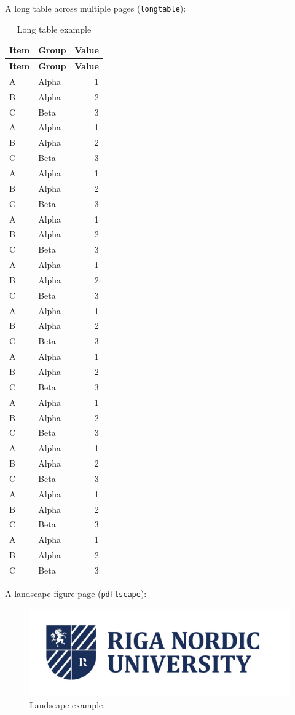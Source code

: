 A long table across multiple pages (\texttt{longtable}):
\begin{longtable}{llr}
\caption{Long table example}\label{tab:long}\\
\toprule
\textbf{Item} & \textbf{Group} & \textbf{Value}\\
\midrule
\endfirsthead
\toprule
\textbf{Item} & \textbf{Group} & \textbf{Value}\\
\midrule
\endhead
\bottomrule
\endfoot
A & Alpha & 1\\
B & Alpha & 2\\
C & Beta  & 3\\
A & Alpha & 1\\
B & Alpha & 2\\
C & Beta  & 3\\
A & Alpha & 1\\
B & Alpha & 2\\
C & Beta  & 3\\
A & Alpha & 1\\
B & Alpha & 2\\
C & Beta  & 3\\
A & Alpha & 1\\
B & Alpha & 2\\
C & Beta  & 3\\
A & Alpha & 1\\
B & Alpha & 2\\
C & Beta  & 3\\
A & Alpha & 1\\
B & Alpha & 2\\
C & Beta  & 3\\
A & Alpha & 1\\
B & Alpha & 2\\
C & Beta  & 3\\
A & Alpha & 1\\
B & Alpha & 2\\
C & Beta  & 3\\
A & Alpha & 1\\
B & Alpha & 2\\
C & Beta  & 3\\
A & Alpha & 1\\
B & Alpha & 2\\
C & Beta  & 3\\
\end{longtable}

A landscape figure page (\texttt{pdflscape}):
\begin{landscape}
\begin{figure}[h]
  \centering
  \includegraphics[width=.9\linewidth]{b_chapters/chapter1/assets/RNU_large_logo.png}
  \caption{Landscape example.}
\end{figure}
\end{landscape}

